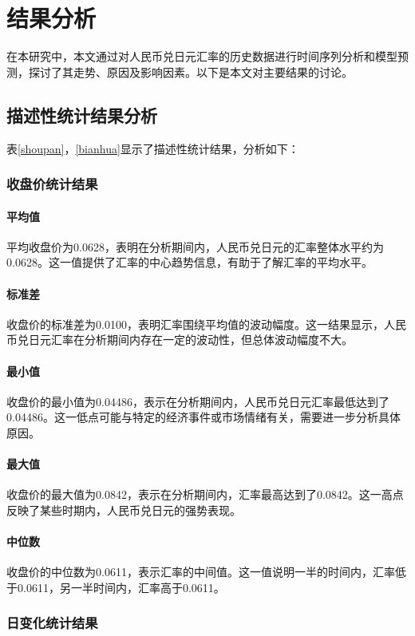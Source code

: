 
\chapter{结果分析}
在本研究中，本文通过对人民币兑日元汇率的历史数据进行时间序列分析和模型预测，探讨了其走势、原因及影响因素。以下是本文对主要结果的讨论。

\section{描述性统计结果分析}
表\ref{shoupan}，\ref{bianhua}显示了描述性统计结果，分析如下：
\subsection{收盘价统计结果}
\subsubsection{平均值}
平均收盘价为0.0628，表明在分析期间内，人民币兑日元的汇率整体水平约为0.0628。这一值提供了汇率的中心趋势信息，有助于了解汇率的平均水平。
\subsubsection{标准差}
收盘价的标准差为0.0100，表明汇率围绕平均值的波动幅度。这一结果显示，人民币兑日元汇率在分析期间内存在一定的波动性，但总体波动幅度不大。
\subsubsection{最小值}
收盘价的最小值为0.04486，表示在分析期间内，人民币兑日元汇率最低达到了0.04486。这一低点可能与特定的经济事件或市场情绪有关，需要进一步分析具体原因。
\subsubsection{最大值}
收盘价的最大值为0.0842，表示在分析期间内，汇率最高达到了0.0842。这一高点反映了某些时期内，人民币兑日元的强势表现。
\subsubsection{中位数}
收盘价的中位数为0.0611，表示汇率的中间值。这一值说明一半的时间内，汇率低于0.0611，另一半时间内，汇率高于0.0611。
\subsection{日变化统计结果}
